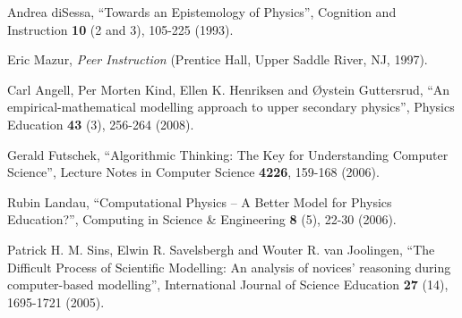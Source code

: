 \documentclass[aps,prb,floatfix,twocolumn,twoside,english]{revtex4-1}
\begin{document}
\begin{thebibliography}{99}
Andrea diSessa, ``Towards an Epistemology of Physics'', Cognition and Instruction {\bf 10} (2 and 3), 105-225 (1993).

Eric Mazur, \textsl{Peer Instruction} (Prentice Hall, Upper Saddle River, NJ, 1997).

Carl Angell, Per Morten Kind, Ellen K. Henriksen and {\O}ystein Guttersrud, ``An empirical-mathematical modelling approach to upper secondary physics'', Physics Education {\bf 43} (3), 256-264 (2008).

Gerald Futschek, ``Algorithmic Thinking: The Key for Understanding Computer Science'', Lecture Notes in Computer Science {\bf 4226}, 159-168 (2006).

Rubin Landau, ``Computational Physics -- A Better Model for Physics Education?'', Computing in Science \& Engineering {\bf 8} (5), 22-30 (2006).

Patrick H. M. Sins, Elwin R. Savelsbergh and Wouter R. van Joolingen, ``The Difficult Process of Scientific Modelling: An analysis of novices' reasoning during computer-based modelling'', International Journal of Science Education {\bf 27} (14), 1695-1721 (2005).

\end{thebibliography}
\end{document}
